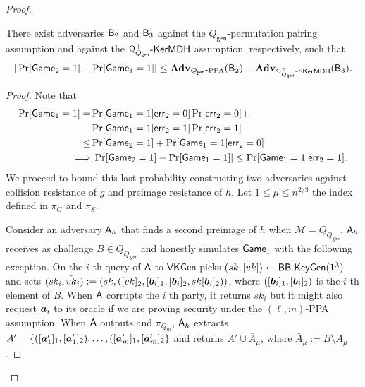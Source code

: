 \begin{proof}
\begin{lemma} There exist adversaries $\mathsf{B}_2$ and $\mathsf{B}_3$ against the ${Q_\mathsf{gen}}$-permutation pairing assumption and against the $\mathcal{Q}^\top_{{Q_\mathsf{gen}}}\mbox{-}\mathsf{KerMDH}$ assumption, respectively, such that
$$
|\Pr[\mathsf{Game}_2=1]-\Pr[\mathsf{Game}_1=1]|\leq \mathbf{Adv}_{{Q_\mathsf{gen}}\mbox{-}\mathrm{PPA}}(\mathsf{B}_2)+\mathbf{Adv}_{\mathcal{Q}^\top_{{Q_\mathsf{gen}}}\mbox{-}\mathsf{SKerMDH}}(\mathsf{B}_3).
$$\label{lemma:fin}
\end{lemma}
\begin{proof}
Note that
\begin{align*}
\Pr[\mathsf{Game}_1=1]
 = &\Pr[\mathsf{Game}_1=1|\mathsf{err}_2=0]\Pr[\mathsf{err}_2=0]+\\
&\Pr[\mathsf{Game}_1=1|\mathsf{err}_2=1]\Pr[\mathsf{err}_2=1]\\
 \leq& \Pr[\mathsf{Game}_2=1] + \Pr[\mathsf{Game}_1=1|\mathsf{err}_2=0]\\
\Longrightarrow  &|\Pr[\mathsf{Game}_2=1]-\Pr[\mathsf{Game}_1=1]|\leq \Pr[\mathsf{Game}_1=1|\mathsf{err}_2=1].
\end{align*}
We proceed to bound this last probability constructing two adversaries against collision resistance of $g$ and preimage resistance of $h$. Let $1\leq \mu\leq n^{2/3}$ the index defined in $\pi_G$ and $\pi_S$.

Consider an adversary $\mathsf{A}_h$ that finds a second preimage of $h$ when $\mathcal{M}=Q_{Q_\mathsf{gen}}$. $\mathsf{A}_h$ receives as challenge $B\in Q_{Q_\mathsf{gen}}$ and honestly simulates $\mathsf{Game}_1$ with the following exception. On the $i$ th query of $\mathsf{A}$ to $\mathsf{VKGen}$ picks $(sk,[vk])\gets\mathsf{BB}.\mathsf{KeyGen}(1^\lambda)$ and sets $(sk_i,\tilde{vk}_i):=(sk,([vk]_2,[{\boldsymbol{b}}_i]_1,[{\boldsymbol{b}}_i]_2,sk[{\boldsymbol{b}}_i]_2))$, where $([{\boldsymbol{b}}_i]_1,[{\boldsymbol{b}}_i]_2)$ is the $i$ th element of $B$. When $\mathsf{A}$ corrupts the $i$ th party, it returns $sk_i$ but it might also request ${\boldsymbol{a}}_i$ to its oracle if we are proving security under the $(\ell,m)$-PPA assumption. When $\mathsf{A}$ outputs and $\pi_{Q_m}$, $\mathsf{A}_h$ extracts $A'=\{([{\boldsymbol{a}}'_1]_1,[{\boldsymbol{a}}'_1]_2),\ldots,([{\boldsymbol{a}}'_m]_1,[{\boldsymbol{a}}'_m]_2\}$ and returns $A'\cup \bar{A}_\mu$, where $\bar{A}_\mu:= B\setminus A_\mu$.


\end{proof}
\end{proof}
